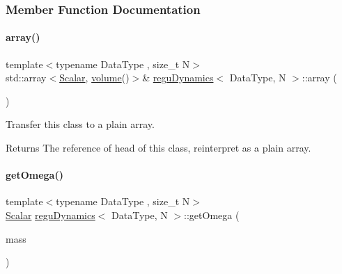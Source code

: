 \subsubsection{Member Function Documentation}
\mbox{\label{classregu_dynamics_aa1c12cfc524f02a52590b2659db79795}} 
\paragraph{\texorpdfstring{array()}{array()}}
{\footnotesize\ttfamily template$<$typename Data\+Type , size\+\_\+t N$>$ \\
std\+::array$<$\mbox{\hyperlink{classregu_dynamics_a359c55370b4dee032396f0df86ad5fab}{Scalar}}, \mbox{\hyperlink{classregu_dynamics_a3a00b2009ce88898871ca024c30c6882}{volume}}()$>$\& \mbox{\hyperlink{classregu_dynamics}{regu\+Dynamics}}$<$ Data\+Type, N $>$\+::array (\begin{DoxyParamCaption}{ }\end{DoxyParamCaption})\hspace{0.3cm}{\ttfamily [inline]}}



Transfer this class to a plain array. 

\begin{DoxyReturn}{Returns}
The reference of head of this class, reinterpret as a plain array. 
\end{DoxyReturn}
\mbox{\label{classregu_dynamics_a0fe3b4f9a468687ec1f004120b347ddd}} 
\paragraph{\texorpdfstring{get\+Omega()}{getOmega()}}
{\footnotesize\ttfamily template$<$typename Data\+Type , size\+\_\+t N$>$ \\
\mbox{\hyperlink{classregu_dynamics_a359c55370b4dee032396f0df86ad5fab}{Scalar}} \mbox{\hyperlink{classregu_dynamics}{regu\+Dynamics}}$<$ Data\+Type, N $>$\+::get\+Omega (\begin{DoxyParamCaption}\item[{\mbox{\hyperlink{classregu_dynamics_a34b4b77ea3e49e1cdef584ec8bd281dc}{Scalar\+Array}} \&}]{mass }\end{DoxyParamCaption})\hspace{0.3cm}{\ttfamily [inline]}}



